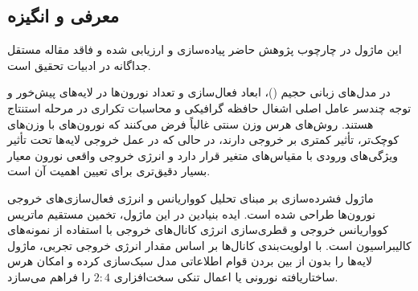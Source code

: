 \subsection{معرفی و انگیزه}
این ماژول در چارچوب پژوهش حاضر پیاده‌سازی و ارزیابی شده و فاقد مقاله مستقل جداگانه در ادبیات تحقیق است.

در مدل‌های زبانی حجیم ()، ابعاد فعال‌سازی و تعداد نورون‌ها در لایه‌های پیش‌خور و توجه چندسر عامل اصلی اشغال حافظه گرافیکی و محاسبات تکراری در مرحله استنتاج هستند. روش‌های هرس وزن سنتی غالباً فرض می‌کنند که نورون‌های با وزن‌های کوچک‌تر، تأثیر کمتری بر خروجی دارند، در حالی که در عمل خروجی لایه‌ها تحت تأثیر ویژگی‌های ورودی با مقیاس‌های متغیر قرار دارد و انرژی خروجی واقعی نورون معیار بسیار دقیق‌تری برای تعیین اهمیت آن است.

ماژول فشرده‌سازی  بر مبنای تحلیل کوواریانس و انرژی فعال‌سازی‌های خروجی نورون‌ها طراحی شده است. ایده بنیادین در این ماژول، تخمین مستقیم ماتریس کوواریانس خروجی و قطری‌سازی انرژی کانال‌های خروجی با استفاده از نمونه‌های کالیبراسیون است. با اولویت‌بندی کانال‌ها بر اساس مقدار انرژی خروجی تجربی، ماژول لایه‌ها را بدون از بین بردن قوام اطلاعاتی مدل سبک‌سازی کرده و امکان هرس ساختاریافته نورونی یا اعمال تنکی سخت‌افزاری $2:4$ را فراهم می‌سازد.
